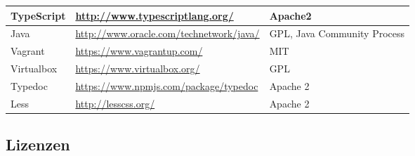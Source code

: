 \begin{landscape}
			\begin{tabularx}{\linewidth}{| l | l | X |}
				\hline
				TypeScript & \url{http://www.typescriptlang.org/} & Apache2 \\
				\hline
				Java & \url{http://www.oracle.com/technetwork/java/} & GPL, Java Community Process\\
				\hline
				Vagrant & \url{https://www.vagrantup.com/} & MIT \\
				\hline
				Virtualbox & \url{https://www.virtualbox.org/} &  GPL \\
				\hline
				Typedoc & \url{https://www.npmjs.com/package/typedoc} &  Apache 2 \\
				\hline
				Less & \url{http://lesscss.org/} &  Apache 2 \\
				\hline
			\end{tabularx}
			
			
	\subsection{Lizenzen}
	\label{subsec:licenses}
	
	\newcommand{\addLicense}[6]{
		#1 & #2 & \url{#3} &
		\begin{itemize}[leftmargin=*,nosep]
			\setlength{\itemsep}{0pt}
    		\setlength{\parskip}{0pt}
	    	\setlength{\parsep}{0pt}
			#4
		\end{itemize}
		 &
		 \begin{itemize}[leftmargin=*,nosep]
			\setlength{\itemsep}{0pt}
    		\setlength{\parskip}{0pt}
	    	\setlength{\parsep}{0pt}
			#5
		\end{itemize}
		&
		\begin{itemize}[leftmargin=*,nosep]
			\setlength{\itemsep}{0pt}
    		\setlength{\parskip}{0pt}
	    	\setlength{\parsep}{0pt}
			#6
		\end{itemize}
		\\ \hline
	}


\end{landscape}
